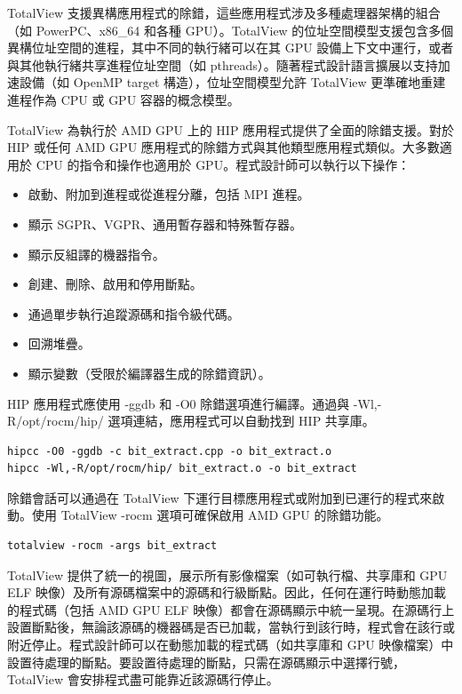 TotalView 支援異構應用程式的除錯，這些應用程式涉及多種處理器架構的組合（如 PowerPC、x86\_64 和各種 GPU）。TotalView 的位址空間模型支援包含多個異構位址空間的進程，其中不同的執行緒可以在其 GPU 設備上下文中運行，或者與其他執行緒共享進程位址空間（如 pthreads）。隨著程式設計語言擴展以支持加速設備（如 OpenMP target 構造），位址空間模型允許 TotalView 更準確地重建進程作為 CPU 或 GPU 容器的概念模型。



TotalView 為執行於 AMD GPU 上的 HIP 應用程式提供了全面的除錯支援。對於 HIP 或任何 AMD GPU 應用程式的除錯方式與其他類型應用程式類似。大多數適用於 CPU 的指令和操作也適用於 GPU。程式設計師可以執行以下操作：

\begin{itemize}
    \item 啟動、附加到進程或從進程分離，包括 MPI 進程。
    \item 顯示 SGPR、VGPR、通用暫存器和特殊暫存器。
    \item 顯示反組譯的機器指令。
    \item 創建、刪除、啟用和停用斷點。
    \item 通過單步執行追蹤源碼和指令級代碼。
    \item 回溯堆疊。
    \item 顯示變數（受限於編譯器生成的除錯資訊）。
\end{itemize}

HIP 應用程式應使用 -ggdb 和 -O0 除錯選項進行編譯。通過與 -Wl,-R/opt/rocm/hip/ 選項連結，應用程式可以自動找到 HIP 共享庫。

\begin{lstlisting}[caption={Listing 13.1: Example compiling a \textit{HIP} program for \textit{TotalView}.}]
hipcc -O0 -ggdb -c bit_extract.cpp -o bit_extract.o
hipcc -Wl,-R/opt/rocm/hip/ bit_extract.o -o bit_extract
\end{lstlisting}

除錯會話可以通過在 TotalView 下運行目標應用程式或附加到已運行的程式來啟動。使用 TotalView -rocm 選項可確保啟用 AMD GPU 的除錯功能。

\begin{lstlisting}[caption={Listing 13.2: Example HIP debugger launch in TotalView.}]
totalview -rocm -args bit_extract
\end{lstlisting}

TotalView 提供了統一的視圖，展示所有影像檔案（如可執行檔、共享庫和 GPU ELF 映像）及所有源碼檔案中的源碼和行級斷點。因此，任何在運行時動態加載的程式碼（包括 AMD GPU ELF 映像）都會在源碼顯示中統一呈現。在源碼行上設置斷點後，無論該源碼的機器碼是否已加載，當執行到該行時，程式會在該行或附近停止。程式設計師可以在動態加載的程式碼（如共享庫和 GPU 映像檔案）中設置待處理的斷點。要設置待處理的斷點，只需在源碼顯示中選擇行號，TotalView 會安排程式盡可能靠近該源碼行停止。

